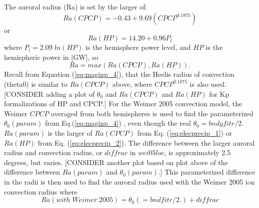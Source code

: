 %
The auroral radius (Ra) is set by the larger of:
%
\begin{equation}
   Ra(CPCP) = -0.43 + 9.69  (CPCP^{0.1875})  \label{eq:elecprecip_1}      
\end{equation}
or
%
\begin{equation}
    Ra(HP) = 14.20 + 0.96 P_l     \label{eq:elecprecip_2}                   
\end{equation}
%
where $P_l = 2.09 \; ln(HP)$ is the hemisphere power level, and $HP$
is the hemispheric power in [GW], so 
%
\begin{equation}
 Ra=max(Ra(CPCP),Ra(HP)).                  
\end{equation}
%
Recall from Equation (\ref{eq:maginp_4}), that the Heelis radius of convection (theta0)
is similar to $Ra(CPCP)$ above, where $CPCP^{0.1875}$ is also used.
[CONSIDER adding a plot of $\theta_0$ and $Ra(CPCP)$ and $Ra(HP)$ for
Kp formalizations of HP and CPCP.]
For the Weimer 2005 convection model, the Weimer $CPCP$ averaged from both
hemispheres is used to find the parameterized $\theta_0(param)$ from Eq.(\ref{eq:maginp_4}) ,
even though the real $\theta_0=bndyfitr/2$.  $Ra(param)$ is the larger of
$Ra(CPCP)$ from Eq. (\ref{eq:elecprecip_1}) or $Ra(HP)$ from Eq. (\ref{eq:elecprecip_2}).  
The difference between
the larger auroral radius and convection radius, or $diffrac$ in $wei05loc$,
is approximately 2.5 degrees, but varies.
[CONSIDER another plot based on plot above of the difference between
$Ra(param)$ and $\theta_0(param)$.]
This parameterized difference in the radii is then used to find the
auroral radius used with the Weimer 2005 ion convection radius where
%
\begin{equation}
  Ra(with  \;Weimer \; 2005) = \theta_0(=bndfitr/2.) + diffrac                     
\end{equation}
%

